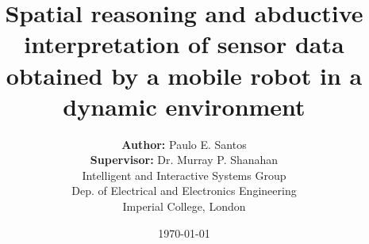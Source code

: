 \documentclass[12pt, a4paper]{book}
\renewcommand{\baselinestretch}{1.5}
\begin{document}


\title{Spatial reasoning and abductive interpretation of sensor data obtained
by a mobile robot in a dynamic environment}
\author{{\bf Author:} Paulo E. Santos\\
        {\bf Supervisor:} Dr. Murray P. Shanahan\\
	Intelligent and Interactive Systems Group\\
	Dep. of Electrical and Electronics Engineering\\
	Imperial College, London}
\date{\today}
\maketitle


%

\pagestyle{headings}


%
%
%
%

\tableofcontents
\pagestyle{fancy}
\fancyhead[L]{\slshape\footnotesize \nouppercase{\rightmark}}
\fancyhead[R]{\thepage}
%

%


\mainmatter
\normalsize


%
%
%
%
%
%
%



\backmatter
%
%

%
\end{document}
